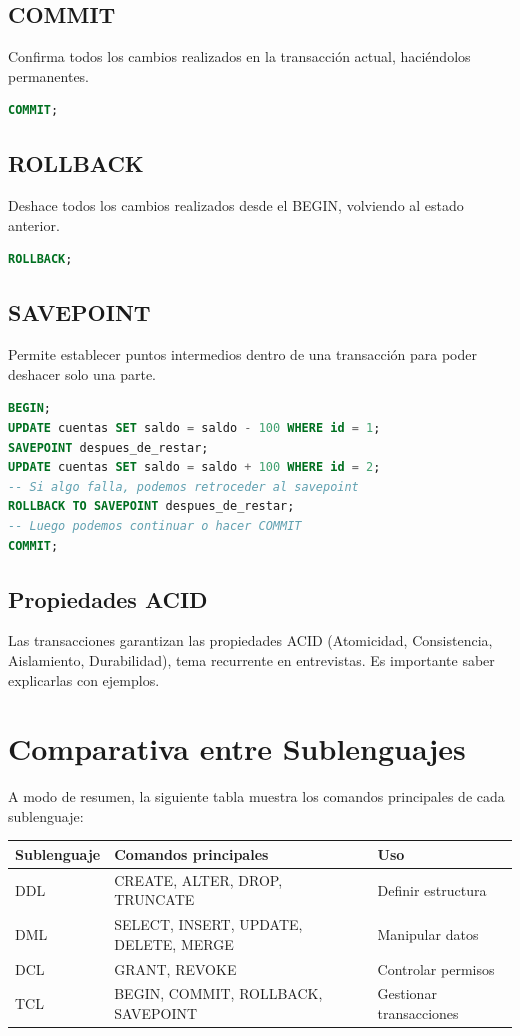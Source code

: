 \documentclass[12pt,a4paper,openany,oneside]{book}
\begin{document}
\subsection{COMMIT}
Confirma todos los cambios realizados en la transacción actual, haciéndolos permanentes.
\begin{lstlisting}[language=SQL]
COMMIT;
\end{lstlisting}

\subsection{ROLLBACK}
Deshace todos los cambios realizados desde el BEGIN, volviendo al estado anterior.
\begin{lstlisting}[language=SQL]
ROLLBACK;
\end{lstlisting}

\subsection{SAVEPOINT}
Permite establecer puntos intermedios dentro de una transacción para poder deshacer solo una parte.
\begin{lstlisting}[language=SQL]
BEGIN;
UPDATE cuentas SET saldo = saldo - 100 WHERE id = 1;
SAVEPOINT despues_de_restar;
UPDATE cuentas SET saldo = saldo + 100 WHERE id = 2;
-- Si algo falla, podemos retroceder al savepoint
ROLLBACK TO SAVEPOINT despues_de_restar;
-- Luego podemos continuar o hacer COMMIT
COMMIT;
\end{lstlisting}

\subsection{Propiedades ACID}
Las transacciones garantizan las propiedades ACID (Atomicidad, Consistencia, Aislamiento, Durabilidad), tema recurrente en entrevistas. Es importante saber explicarlas con ejemplos.

\section{Comparativa entre Sublenguajes}
A modo de resumen, la siguiente tabla muestra los comandos principales de cada sublenguaje:

\begin{center}
\begin{tabular}{|l|l|l|}
\hline
\textbf{Sublenguaje} & \textbf{Comandos principales} & \textbf{Uso} \\ \hline
DDL & CREATE, ALTER, DROP, TRUNCATE & Definir estructura \\ \hline
DML & SELECT, INSERT, UPDATE, DELETE, MERGE & Manipular datos \\ \hline
DCL & GRANT, REVOKE & Controlar permisos \\ \hline
TCL & BEGIN, COMMIT, ROLLBACK, SAVEPOINT & Gestionar transacciones \\ \hline
\end{tabular}
\end{center}
\end{document}
